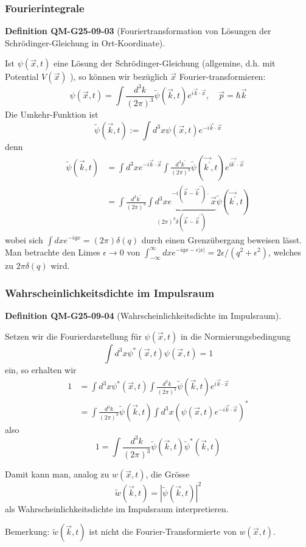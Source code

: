 \documentclass[10pt, letterpaper]{article}
\newcommand{\CustomHeading}[3]{%
  \par\medskip\noindent%
  \textbf{#1 #2} \textnormal{(#3)}.\enskip%
}
\newenvironment{DEF}[2]{\begin{unitbox}\CustomHeading{Definition}{#1}{#2}}{\end{unitbox}}
\begin{document}
\subsubsection*{Fourierintegrale}


\begin{DEF}{QM-G25-09-03}{Fouriertransformation von Lösungen der Schrödinger-Gleichung in Ort-Koordinate}
Ist $\psi(\vec{x}, t)$ eine Lösung der Schrödinger-Gleichung (allgemine, d.h. mit Potential $V(\vec{x})$ ), so können wir bezüglich $\vec{x}$ Fourier-transformieren:
$$
\psi(\vec{x}, t)=\int \frac{d^{3} k}{(2 \pi)^{3}} \tilde{\psi}(\vec{k}, t) e^{i \vec{k} \cdot \vec{x}}, \quad \vec{p}=\hbar \vec{k}
$$
Die Umkehr-Funktion ist
$$
\tilde{\psi}(\vec{k}, t):=\int d^{3} x \psi(\vec{x}, t) e^{-i \vec{k} \cdot \vec{x}}
$$
denn
$$
\begin{aligned}
\tilde{\psi}(\vec{k}, t) & =\int d^{3} x e^{-i \vec{k} \cdot \vec{x}} \int \frac{d^{3} k^{\prime}}{(2 \pi)^{3}} \tilde{\psi}\left(\overrightarrow{k^{\prime}}, t\right) e^{i \overrightarrow{k^{\prime}} \cdot \vec{x}} \\
& =\int \frac{d^{3} k^{\prime}}{(2 \pi)^{3}} \underbrace{\int d^{3} x e^{-i\left(\vec{k}-\vec{k}^{\prime}\right) \cdot} \vec{x}}_{(2 \pi)^{3} \delta\left(\vec{k}-\vec{k}^{\prime}\right)} \tilde{\psi}\left(\overrightarrow{k^{\prime}}, t\right)
\end{aligned}
$$
wobei sich $\int d x e^{-i q x}=(2 \pi) \delta(q)$ durch einen Grenzübergang beweisen lässt. Man betrachte den Limes $\epsilon \rightarrow 0$ von $\int_{-\infty}^{\infty} d x e^{-i q x-\epsilon|x|}=2 \epsilon /\left(q^{2}+\epsilon^{2}\right)$, welches zu $2 \pi \delta(q)$ wird.
\end{DEF}


\subsubsection*{Wahrscheinlichkeitsdichte im Impulsraum}




\begin{DEF}{QM-G25-09-04}{Wahrscheinlichkeitsdichte im Impulsraum}
Setzen wir die Fourierdarstellung für $\psi(\vec{x}, t)$ in die Normierungsbedingung
$$
\int d^{3} x \psi^{*}(\vec{x}, t) \psi(\vec{x}, t)=1
$$
ein, so erhalten wir
$$
\begin{aligned}
1 & =\int d^{3} x \psi^{*}(\vec{x}, t) \int \frac{d^{3} k}{(2 \pi)^{3}} \tilde{\psi}(\vec{k}, t) e^{i \vec{k} \cdot \vec{x}} \\
& =\int \frac{d^{3} k}{(2 \pi)^{3}} \tilde{\psi}(\vec{k}, t) \int d^{3} x\left(\psi(\vec{x}, t) e^{-i \vec{k} \cdot \vec{x}}\right)^{*}
\end{aligned}
$$
also
$$
1=\int \frac{d^{3} k}{(2 \pi)^{3}} \tilde{\psi}(\vec{k}, t) \tilde{\psi}^{*}(\vec{k}, t)
$$

Damit kann man, analog zu $w(\vec{x}, t)$, die Grösse
$$
\tilde{w}(\vec{k}, t)=|\tilde{\psi}(\vec{k}, t)|^{2}
$$
als Wahrscheinlichkeitsdichte im Impulsraum interpretieren.

Bemerkung: $\tilde{w}(\vec{k}, t)$ ist nicht die Fourier-Transformierte von $w(\vec{x}, t)$.
\end{DEF}
\end{document}
